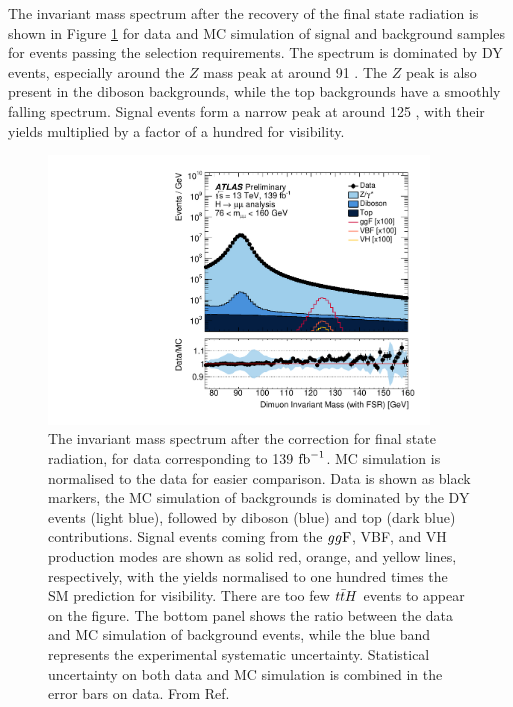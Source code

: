 The invariant mass spectrum after the recovery of the final
state radiation is shown in Figure \ref{fig:hmumu:sel-mmumu} for data and
MC simulation of signal and background samples for events
passing the selection requirements. The spectrum is dominated by DY
events, especially around the $Z$ mass peak at around 91 \GeV.
The $Z$ peak is also present in the diboson backgrounds, while
the top backgrounds have a smoothly falling spectrum.
Signal events form a narrow peak at around 125 \GeV, with their yields
multiplied by a factor of a hundred for visibility.
\begin{figure}[h!]
  \centering
  \includegraphics[width=0.9\textwidth]{figures/hmumu/sel-mmumu}
  \caption[Dimuon invariant mass spectrum of selected events.]{
  The invariant mass spectrum after the correction for
  final state radiation, for data corresponding to 139 $\text{fb}^{-1}$.
  MC simulation is normalised to the data for easier comparison.
  Data is shown as black markers, the MC simulation of backgrounds
   is dominated by the DY events (light blue),
  followed by diboson (blue) and top (dark blue) contributions.
  Signal events coming from the $gg\text{F}$, VBF, and VH production
  modes are shown as solid red, orange, and yellow lines,
  respectively, with the yields normalised to one hundred times the
  SM prediction for visibility. There are too few $t\bar{t} H$ events to appear
  on the figure. The bottom panel shows the ratio between the data
  and MC simulation of background events, while the blue band
  represents the experimental systematic uncertainty. Statistical
  uncertainty on both data and MC simulation is combined in the
  error bars on data. From Ref. \cite{ATLAS-CONF-2019-028}}
  \label{fig:hmumu:sel-mmumu}
\end{figure}

